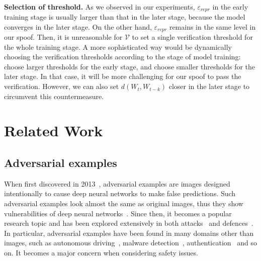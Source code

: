 \documentclass[conference]{IEEEtran}
\newcommand{\Verif}{\mathcal{V}\xspace}
\newcommand{\Paragraph}[1]{~\vspace*{-0.8\baselineskip}\\{\bf #1}}
\begin{document}
\Paragraph{Selection of threshold.}
As we {observed\EndAccSupp{}} in our experiments, $\varepsilon_{\mathit{repr}}$ in the early training {stage\EndAccSupp{}} is usually larger than that in the later stage, because the model converges in the later stage. 
On the other hand, $\varepsilon_{\mathit{repr}}$ {remains\EndAccSupp{}} in the same {level\EndAccSupp{}} in our spoof.
Then, it is unreasonable for $\Verif$ to set a single verification {threshold\EndAccSupp{}} for the whole training stage.
A more sophisticated way would be dynamically {choosing\EndAccSupp{}} the verification {thresholds\EndAccSupp{}} according to the stage of model training:  choose larger thresholds for the early stage, and choose smaller thresholds for the later stage.
In that case, it will be more challenging for our {spoof\EndAccSupp{}} to pass the verification.
However, we can also set $d(W_t, W_{t-k})$ closer in the later stage to circumvent this countermeasure. 
\section{Related Work}
\label{sec:related}

\subsection{Adversarial examples}

When first discovered in 2013~\cite{intri2013}, adversarial examples are {images\EndAccSupp{}} designed intentionally to cause {deep\EndAccSupp{}} {neural\EndAccSupp{}} {networks\EndAccSupp{}} to make false predictions. 
Such adversarial examples look almost the same as  original images, thus they show vulnerabilities of {deep\EndAccSupp{}} neural networks~\cite{goodfellow2014explaining}. 
Since then, it becomes a popular {research\EndAccSupp{}} topic and has been {explored\EndAccSupp{}} extensively in both attacks~\cite{dong2018boosting, su2019one} and defences~\cite{papernot2016distillation,buckman2018thermometer,Bhagoji2018Enhancing,zheng2016improving,wang2017learning,luo2016foveationbased}. 
In particular, adversarial examples have been found in many {domains\EndAccSupp{}} other than images, such as {autonomous\EndAccSupp{}} driving~\cite{lu2017adversarial,lu2017need}, {malware\EndAccSupp{}} detection~\cite{Grosse2017adversarial,Rosenberg2018Generic}, authentication~\cite{zhou2018invisible} and so on.
It becomes a major concern when considering {safety\EndAccSupp{}} issues.
\end{document}
